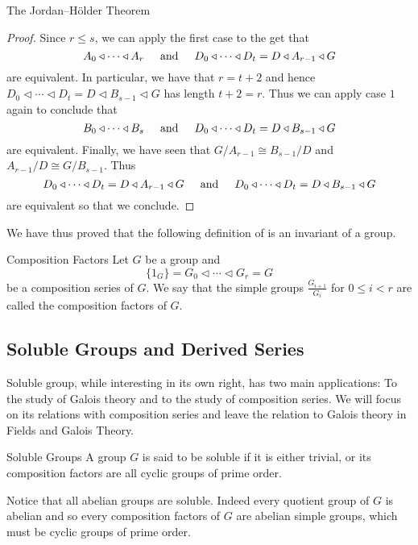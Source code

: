 \documentclass[a4paper]{article}
\begin{document}
\begin{thm}{The Jordan–Hölder Theorem}{}
\begin{proof}
Since $r\leq s$, we can apply the first case to the get that $$A_0\triangleleft\cdots\triangleleft A_r\text{\;\;\;\; and \;\;\;\;}D_0\triangleleft\cdots\triangleleft D_t=D\triangleleft A_{r-1}\triangleleft G$$ are equivalent. In particular, we have that $r=t+2$ and hence $D_0\triangleleft\cdots\triangleleft D_t=D\triangleleft B_{s-1}\triangleleft G$ has length $t+2=r$. Thus we can apply case $1$ again to conclude that $$B_0\triangleleft\cdots\triangleleft B_s\text{\;\;\;\; and \;\;\;\;}D_0\triangleleft\cdots\triangleleft D_t=D\triangleleft B_{s-1}\triangleleft G$$ are equivalent. Finally, we have seen that $G/A_{r-1}\cong B_{s-1}/D$ and $A_{r-1}/D\cong G/B_{s-1}$. Thus $$D_0\triangleleft\cdots\triangleleft D_t=D\triangleleft A_{r-1}\triangleleft G\text{\;\;\;\; and \;\;\;\;}D_0\triangleleft\cdots\triangleleft D_t=D\triangleleft B_{s-1}\triangleleft G$$ are equivalent so that we conclude. 
\end{proof}
\end{thm}

We have thus proved that the following definition of is an invariant of a group. 

\begin{defn}{Composition Factors}{} Let $G$ be a group and $$\{1_G\}=G_0\triangleleft\cdots\triangleleft G_r=G$$ be a composition series of $G$. We say that the simple groups $\frac{G_{i+1}}{G_i}$ for $0\leq i<r$ are called the composition factors of $G$. 
\end{defn}

\subsection{Soluble Groups and Derived Series}
Soluble group, while interesting in its own right, has two main applications: To the study of Galois theory and to the study of composition series. We will focus on its relations with composition series and leave the relation to Galois theory in Fields and Galois Theory. 

\begin{defn}{Soluble Groups}{} A group $G$ is said to be soluble if it is either trivial, or its composition factors are all cyclic groups of prime order. 
\end{defn}

Notice that all abelian groups are soluble. Indeed every quotient group of $G$ is abelian and so every composition factors of $G$ are abelian simple groups, which must be cyclic groups of prime order. 
\end{document}
